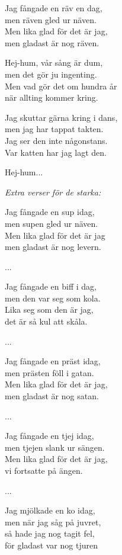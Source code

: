\vspace{10pt}
Jag fångade en räv en dag,\\
men räven gled ur näven.\\
Men lika glad för det är jag,\\
men gladast är nog räven.\par
\vspace{10pt}
Hej-hum, vår sång är dum,\\
men det gör ju ingenting.\\
Men vad gör det om hundra år\\
när allting kommer kring.\par
\vspace{10pt}
Jag skuttar gärna kring i dans,\\
men jag har tappat takten.\\
Jag ser den inte någonstans.\\
Var katten har jag lagt den.\par
\vspace{10pt}
Hej-hum...\par
\vspace{10pt}
{\footnotesize\textit{Extra verser för de starka:}}\par
\vspace{10pt}
Jag fångade en sup idag,\\
men supen gled ur näven.\\
Men lika glad för det är jag\\
men gladast är nog levern.\par
\vspace{6pt}
...\par
\vspace{10pt}
Jag fångade en biff i dag,\\
men den var seg som kola.\\
Lika seg som den är jag,\\
det är så kul att skåla.\par
\newpage
...\par
\vspace{10pt}
Jag fångade en präst idag,\\
men prästen föll i gatan.\\
Men lika glad för det är jag,\\
men gladast är nog satan.\par
\vspace{6pt}
...\par
\vspace{10pt}
Jag fångade en tjej idag,\\
men tjejen slank ur sängen.\\
Men lika glad för det är jag,\\
vi fortsatte på ängen.\par
\vspace{6pt}
...\par
\vspace{10pt}
Jag mjölkade en ko idag,\\
men när jag såg på juvret,\\
så hade jag nog tagit fel,\\
för gladast var nog tjuren

